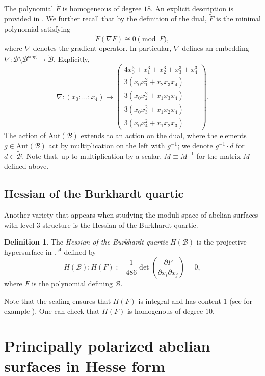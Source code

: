 \documentclass[11pt]{amsart}
\theoremstyle{definition}
\newtheorem{definition}[theorem]{Definition}
\newcommand{\B}{\mathcal{B}}
\newcommand{\Bs}{\mathcal{B}^{\text{sing}}}
\newcommand{\Aut}{\text{Aut}}
\newcommand{\PP}{\mathbb{P}}
\begin{document}
 The polynomial $\tilde{F}$ is homogeneous of degree $18$. An explicit description is provided in \cite[Proposition 3]{freitag2004burkhardt1}.  We further recall that by the definition of the dual, $\tilde{F}$ is the minimal polynomial satisfying
\[
\tilde{F}(\nabla F) \cong 0 \pmod{F},
\]
where $\nabla$ denotes the gradient operator. In particular, $\nabla$ defines an embedding $\nabla: \B \setminus \Bs \to \tilde{\B}$. Explicitly, 
\begin{equation}
	\label{eq:gradient-embedding}
	\nabla : (x_0: \dots: x_4) \mapsto \begin{pmatrix}
		4 x_0^3 + x_1^3 + x_2^3 + x_3^3 + x_4^3\\
		3(x_0x_1^2 + x_2x_3x_4)\\
		3(x_0x_2^2 + x_1x_3x_4)\\
		3(x_0x_3^2 + x_1x_2x_4)\\
		3(x_0x_4^2 + x_1x_2x_3)
	\end{pmatrix} .
\end{equation}
The action of $\Aut(\B)$ extends to an action on the dual, where the elements $g \in \Aut(\B)$ act by multiplication on the left with $g^{-1}$; we denote $g^{-1} \cdot d$ for $d \in \tilde{\B}$. Note that, up to multiplication by a scalar, $M \equiv M^{-1}$ for the matrix $M$ defined above.

\subsection{Hessian of the Burkhardt quartic} Another variety that appears when studying the moduli space of abelian surfaces with level-$3$ structure is the Hessian of the Burkhardt quartic. 

\begin{definition}\label{def:hessian}
    The {\em Hessian of the Burkhardt quartic} $H(\B)$ is the projective hypersurface in $\PP^4$ defined by 
    \[
    H(\B): H(F) := \frac{1}{486} \det\left( \frac{\partial F}{\partial x_i \partial x_j}\right) = 0,
    \]
    where $F$ is the polynomial defining $\B$. 
\end{definition}

Note that the scaling ensures that $H(F)$ is integral and has content $1$ (see for example \cite[Section 3]{bruin2018arithmetic}).  One can check that $H(F)$ is homogenous of degree $10$. 

\section{Principally polarized abelian surfaces in Hesse form} \label{sec:hesse-form}
\end{document}
